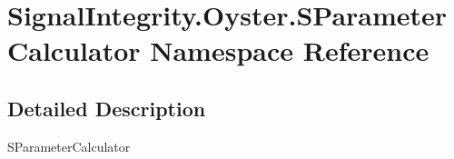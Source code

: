 \hypertarget{namespaceSignalIntegrity_1_1Oyster_1_1SParameterCalculator}{}\section{Signal\+Integrity.\+Oyster.\+S\+Parameter\+Calculator Namespace Reference}
\label{namespaceSignalIntegrity_1_1Oyster_1_1SParameterCalculator}


\subsection{Detailed Description}
\begin{DoxyVerb}SParameterCalculator\end{DoxyVerb}
 